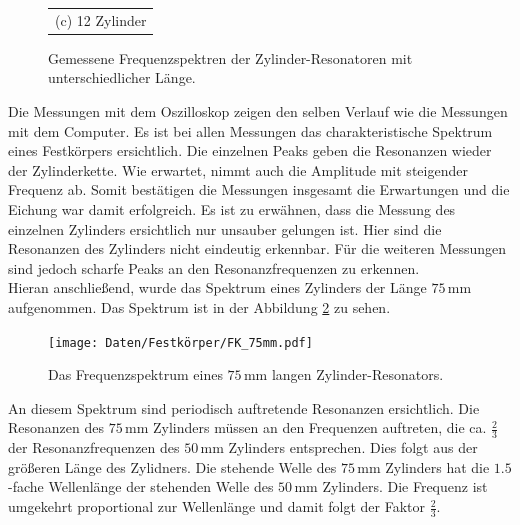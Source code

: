 \begin{figure}[H]
\begin{tabular}{c}
    (c) 12 Zylinder \\[6pt]
    \end{tabular}
    \caption{Gemessene Frequenzspektren der Zylinder-Resonatoren mit unterschiedlicher Länge. } 
    \label{fig:zyl1-6-12}
\end{figure}

Die Messungen mit dem Oszilloskop zeigen den selben Verlauf wie die Messungen mit dem Computer. Es ist bei allen Messungen das charakteristische Spektrum eines Festkörpers ersichtlich. Die einzelnen Peaks geben die Resonanzen wieder der Zylinderkette. Wie erwartet, nimmt auch die Amplitude mit steigender Frequenz ab. 
Somit bestätigen die Messungen insgesamt die Erwartungen und die Eichung war damit erfolgreich. 
Es ist zu erwähnen, dass die Messung des einzelnen Zylinders ersichtlich nur unsauber gelungen ist. Hier sind die Resonanzen des Zylinders nicht eindeutig erkennbar. Für die weiteren Messungen sind jedoch scharfe Peaks an den Resonanzfrequenzen zu erkennen. \\
Hieran anschließend, wurde das Spektrum eines Zylinders der Länge $75\,\si{\milli\metre}$ aufgenommen. Das Spektrum ist in der Abbildung \ref{fig:fkp75mm} zu sehen.

\begin{figure}[H]
    \centering
    \texttt{[image: Daten/Festkörper/FK\_75mm.pdf]}
    \caption{Das Frequenzspektrum eines $75 \,\si{\milli\metre}$ langen Zylinder-Resonators. }
    \label{fig:fkp75mm}
\end{figure}
An diesem Spektrum sind periodisch auftretende Resonanzen ersichtlich. Die Resonanzen des $75 \,\si{\milli\metre}$ Zylinders müssen an den Frequenzen auftreten, die ca. $\frac{2}{3}$ der Resonanzfrequenzen des $50 \,\si{\milli\metre}$ Zylinders entsprechen. 
Dies folgt aus der größeren Länge des Zylidners. Die stehende Welle des $75 \,\si{\milli\metre}$ Zylinders hat die $1.5$-fache Wellenlänge der stehenden Welle des $50 \,\si{\milli\metre}$ Zylinders. Die Frequenz ist umgekehrt proportional zur Wellenlänge und damit folgt der Faktor $\frac{2}{3}$.

